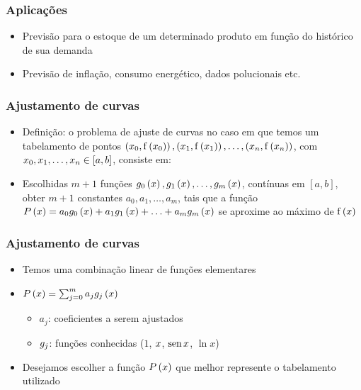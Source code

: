 \begin{frame}
\frametitle{Aplicações}

\begin{itemize}[<+->]
  \item Previsão para o estoque de um determinado produto em função do histórico de sua demanda

  \item Previsão de inflação, consumo energético, dados polucionais etc.
\end{itemize}
\end{frame}

\begin{frame}
\frametitle{Ajustamento de curvas}

\begin{itemize}
  \item Definição: o problema de ajuste de curvas no caso em que temos um tabelamento de pontos 
$\left(x_0, \mathrm{f}\left(x_0\right)\right), \left(x_1, \mathrm{f}\left(x_1\right) \right), \ldots, \left(x_n, \mathrm{f}\left(x_n\right) \right) $, com $x_0, x_1, \ldots, x_n \in [a,b]$, consiste em:
  
  \item Escolhidas $m+1$ funções 
$g_0\left(x\right), g_1\left(x\right), \ldots, g_m\left(x\right) $, contínuas em $[a,b]$, obter $m+1$ constantes $a_0, a_1, \ldots, a_m$, tais que a função $P\left(x \right) = a_0 g_0\left(x\right) + a_1 g_1 \left(x\right) + \ldots + a_m g_m \left(x\right) $ se aproxime ao máximo de $\mathrm{f}\left(x\right) $
\end{itemize}
\end{frame}

\begin{frame}
\frametitle{Ajustamento de curvas}

\begin{itemize}
  \item Temos uma combinação linear de funções elementares
  \item $P\left(x\right) = \sum_{j=0}^m a_j g_j \left(x\right) $
    \begin{itemize}
      \item $a_j$: coeficientes a serem ajustados
      \item $g_j$: funções conhecidas ($1$, $x$, $\operatorname{\text{sen}} x$, $\ln x$)
    \end{itemize}
  \item Desejamos escolher a função $P\left(x\right)$ que melhor represente o tabelamento utilizado
\end{itemize}
\end{frame}

